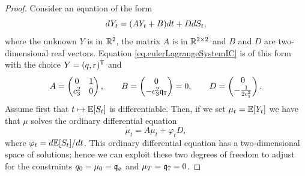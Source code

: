 \documentclass[10pt,a4paper]{article}
\begin{document}
\begin{proof}
		Consider an equation of the form
		\begin{equation*}
		dY_t = (AY_t + B)dt + D dS_t,
		\end{equation*}
		where the unknown $Y$ is in $\mathbb{R}^{2}$, the matrix $A$ is in $\mathbb{R}^{2\times 2}$ and $B$ and $D$ are two-dimensional real vectors. Equation \eqref{eq.eulerLagrangeSystemIC} is of this form with the choice $Y=(q,r)^{\mathsf{T}}$ and
		\begin{equation*}
		A=
		\begin{pmatrix}
		0 & 1 \\ 
		c_{3}^{2} & 0 
		\end{pmatrix}, \qquad
		B= 
		\begin{pmatrix}
		0 \\ -c_{3}^{2} \mathfrak{q}_{\mathtt{T} }
		\end{pmatrix}
		 = 0, \qquad
		D= 
		\begin{pmatrix}
		0 \\ -\frac{1}{2c_{1}^{2}}
		\end{pmatrix}.
		\end{equation*} 
		Assume first that $t\mapsto \mathbb{{E}}[S_t]$ is differentiable. Then, if we set $\mu_t=\mathbb{{E}}[Y_t]$ we have that $\mu$ solves the ordinary differential equation
		\begin{equation}\label{eq.ODEforExpectedInventory}
		\dot{\mu}_t = A\mu_t + \varphi_t D,
		\end{equation}
		where $\varphi_t= d\mathbb{{E}}[S_t]/dt$. This ordinary differential equation has a two-dimensional space of solutions; hence we can exploit these two degrees of freedom to adjust for the constraints $q_0 = \mu_0 = \mathfrak{q_0}$ and $\mu_T  = \mathfrak{q}_{\mathtt{T} } = 0$. 
		

\end{proof}
\end{document}
